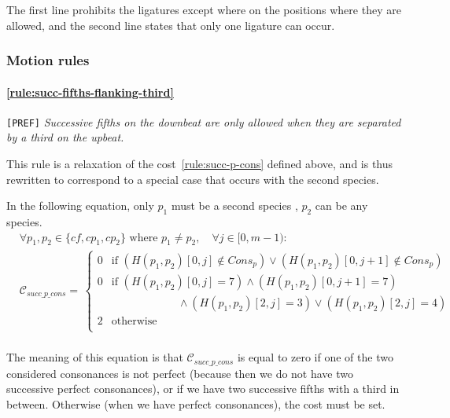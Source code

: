     The first line prohibits the ligatures except where on the positions where they are allowed, and the second line states that only one ligature can occur.

\subsubsection{Motion rules}
\paragraph{\hspace{.6cm}\ref{rule:succ-fifths-flanking-third}} \texttt{[PREF]} \textit{Successive fifths on the downbeat are only allowed when they are separated by a third on the upbeat.} 

    This rule is a relaxation of the cost~\ref{rule:succ-p-cons} defined above, and is thus rewritten to correspond to a special case that occurs with the second species.
        
    In the following equation, only $p_1$ must be a second species \cp, $p_2$ can be any species.
    \begin{equation}
        \begin{aligned}
            & \forall p_1, p_2 \in \{\mathit{cf}, cp_1, cp_2\} \text{ where }  p_1 \neq p_2, \quad \forall j \in [0, m-1): \\
            &\mathcal{C}_{succ\_p\_cons} = \,  
            \begin{cases}
                0 & \text{if } (H(p_1, p_2)[0, j] \notin Cons_p) \lor (H(p_1, p_2)[0, j+1] \notin Cons_p)\\
                0 & \text{if } (H(p_1, p_2)[0, j] = 7 ) \land (H(p_1, p_2)[0, j+1] = 7) \\
                & \quad \quad \quad \quad \quad \quad\land (H(p_1, p_2)[2, j] = 3) \lor (H(p_1, p_2)[2, j] = 4)\\
                2 & \text{otherwise } \\
            \end{cases}\\
        \end{aligned}
    \end{equation}

    The meaning of this equation is that $\mathcal{C}_{succ\_p\_cons}$ is equal to zero if one of the two considered consonances is not perfect (because then we do not have two successive perfect consonances), or if we have two successive fifths with a third in between. Otherwise (when we have perfect consonances), the cost must be set.

